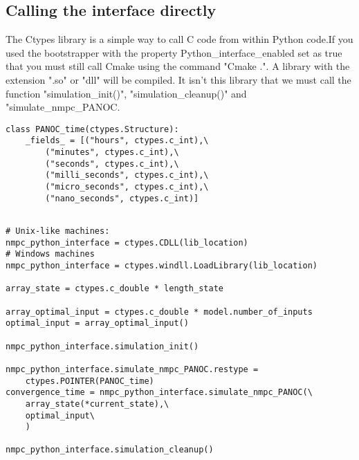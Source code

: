 \subsection{Calling the interface directly}
The Ctypes library is a simple way to call C  code from within Python code.If you used the bootstrapper  with the property Python\_interface\_enabled set as true that you must still call Cmake  using the command "Cmake .". A library with the extension ".so" or "dll" will be compiled. It isn't this library that we must call the function "simulation\_init()", "simulation\_cleanup()" and "simulate\_nmpc\_PANOC.

\begin{lstlisting}[caption={ctype structure return by simulation},captionpos=b,label={lst:ctype structure return by simulation}]
class PANOC_time(ctypes.Structure):
	_fields_ = [("hours", ctypes.c_int),\
		("minutes", ctypes.c_int),\
		("seconds", ctypes.c_int),\
		("milli_seconds", ctypes.c_int),\
		("micro_seconds", ctypes.c_int),\
		("nano_seconds", ctypes.c_int)]
\end{lstlisting}

\begin{lstlisting}[caption={calling c code directly example},captionpos=b,label={lst:calling c code directly example}]

# Unix-like machines:
nmpc_python_interface = ctypes.CDLL(lib_location) 
# Windows machines
nmpc_python_interface = ctypes.windll.LoadLibrary(lib_location) 

array_state = ctypes.c_double * length_state

array_optimal_input = ctypes.c_double * model.number_of_inputs
optimal_input = array_optimal_input()

nmpc_python_interface.simulation_init()

nmpc_python_interface.simulate_nmpc_PANOC.restype = 
	ctypes.POINTER(PANOC_time)
convergence_time = nmpc_python_interface.simulate_nmpc_PANOC(\
	array_state(*current_state),\
	optimal_input\
	)

nmpc_python_interface.simulation_cleanup()
\end{lstlisting}